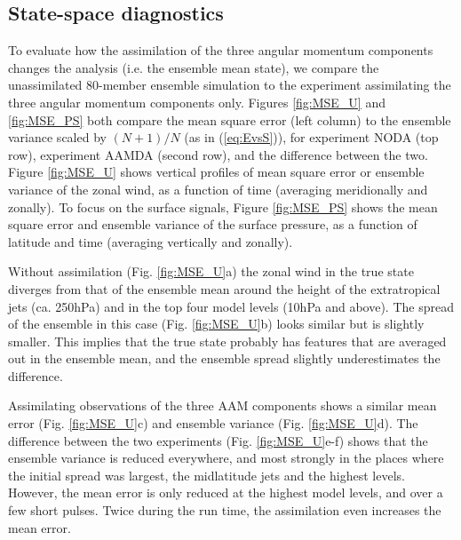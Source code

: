 \subsection{State-space diagnostics}
\label{sec:erpda}

To evaluate how the assimilation of the three angular momentum components changes the analysis (i.e. the ensemble mean state), we compare the unassimilated 80-member ensemble simulation to the experiment assimilating the three angular momentum components only. 
Figures \ref{fig:MSE_U} and \ref{fig:MSE_PS} both compare the mean square error (left column) to the ensemble variance scaled by $(N+1)/N$ (as in (\ref{eq:EvsS})), for experiment NODA (top row), experiment AAMDA (second row), and the difference between the two.
Figure \ref{fig:MSE_U} shows vertical profiles of mean square error or ensemble variance of the zonal wind, as a function of time (averaging meridionally and zonally). 
To focus on the surface signals, Figure \ref{fig:MSE_PS} shows the mean square error and ensemble variance of the surface pressure,  as a function of latitude and time (averaging vertically and zonally). 

Without assimilation (Fig. \ref{fig:MSE_U}a) the zonal wind in the true state diverges from that of the ensemble mean around the height of the extratropical jets (ca. 250hPa) and in the top four model levels (10hPa and above). 
The spread of the ensemble in this case (Fig. \ref{fig:MSE_U}b) looks similar but is slightly smaller. 
This implies that the true state probably has features that are averaged out in the ensemble mean, and the ensemble spread slightly underestimates the difference.

Assimilating observations of the three AAM components shows a similar mean error (Fig. \ref{fig:MSE_U}c) and ensemble variance (Fig. \ref{fig:MSE_U}d).
The difference between the two experiments (Fig. \ref{fig:MSE_U}e-f)  shows that the ensemble variance is reduced everywhere, and most strongly in the places where the initial spread was largest, the midlatitude jets and the highest levels. 
However, the mean error is only reduced at the highest model levels, and over a few short pulses. 
Twice during the run time, the assimilation even increases the mean error. 

